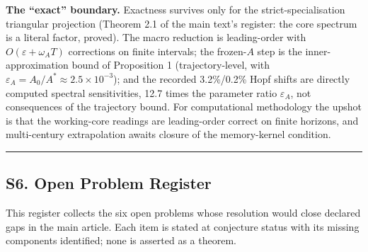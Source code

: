 \documentclass[
  10pt,
  a4paper,
]{article}
\begin{document}
\textbf{The ``exact'' boundary.} Exactness survives only for the
strict-specialisation triangular projection (Theorem 2.1 of the main
text's register: the core spectrum is a literal factor, proved). The
macro reduction is leading-order with \(O(\varepsilon+\omega_A T)\)
corrections on finite intervals; the frozen-\(A\) step is the
inner-approximation bound of Proposition 1 (trajectory-level, with
\(\varepsilon_A=A_0/A^*\approx2.5\times10^{-3}\)); and the recorded
3.2\%/0.2\% Hopf shifts are directly computed spectral sensitivities,
12.7 times the parameter ratio \(\varepsilon_A\), not consequences of
the trajectory bound. For computational methodology the upshot is that
the working-core readings are leading-order correct on finite horizons,
and multi-century extrapolation awaits closure of the memory-kernel
condition.

\begin{center}\rule{0.5\linewidth}{0.5pt}\end{center}

\subsection{S6. Open Problem Register}\label{s6.-open-problem-register}

This register collects the six open problems whose resolution would
close declared gaps in the main article. Each item is stated at
conjecture status with its missing components identified; none is
asserted as a theorem.
\end{document}
